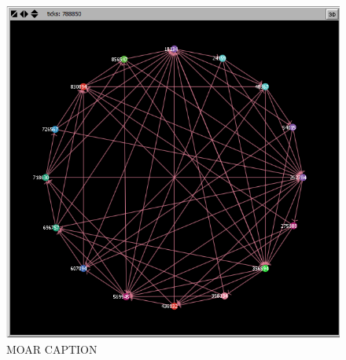 \documentclass[12pt]{ieeetran} %
\begin{document}
\begin{figure}
\includegraphics[width=\linewidth]{fixed_example}
\caption{MOAR CAPTION}
\label{fixed}
\end{figure}








\end{document}
